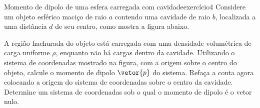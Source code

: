 \begin{exercício}{Momento de dipolo de uma esfera carregada com cavidade}{exercício4}
    Considere um objeto esférico maciço de raio \(a\) contendo uma cavidade de raio \(b\), localizada a uma distância \(d\) de seu centro, como mostra a figura abaixo.
    \begin{center}
    \end{center}
    A região hachurada do objeto está carregada com uma densidade volumétrica de carga uniforme \(\rho\), enquanto não há cargas dentro da cavidade. Utilizando o sistema de coordenadas mostrado na figura, com a origem sobre o centro do objeto, calcule o momento de dipolo \(\vetor{p}\) do sistema. Refaça a conta agora colocando a origem do sistema de coordenadas sobre o centro da cavidade. Determine um sistema de coordenadas sob o qual o momento de dipolo é o vetor nulo.
\end{exercício}
